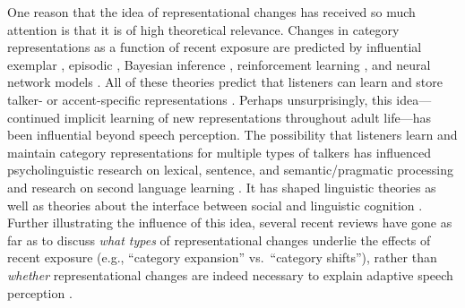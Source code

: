 \documentclass[
  11pt,
  man,floatsintext]{apa6}
\begin{document}
One reason that the idea of representational changes has received so much attention is that it is of high theoretical relevance. Changes in category representations as a function of recent exposure are predicted by influential exemplar \autocite{apfelbaum-mcmurray2015,johnson2006}, episodic \autocite{goldinger1998}, Bayesian inference \autocite{kleinschmidt-jaeger2015}, reinforcement learning \autocite{harmon2019}, and neural network models \autocite{lancia-winter2013}. All of these theories predict that listeners can learn and store talker- or accent-specific representations \autocites[see also][]{bradlow-bent2008,baeseberk2013,tzeng2016}. Perhaps unsurprisingly, this idea---continued implicit learning of new representations throughout adult life---has been influential beyond speech perception. The possibility that listeners learn and maintain category representations for multiple types of talkers has influenced psycholinguistic research on lexical, sentence, and semantic/pragmatic processing \autocites{chang2012,fine2013,kaschak2004,pogue2016,prasad2021,ryskin2019,schuster-degen2020}[ for review, see][]{brown-schmidt2015} and research on second language learning \autocites[for reviews, see][]{kaan-chun2018,pajak2016}. It has shaped linguistic theories \autocites[e.g.,][]{bybee2001,goldinger-azuma2004,hay2019,magnuson-nusbaum2007,pierrehumbert2001} as well as theories about the interface between social and linguistic cognition \autocites[e.g.,][]{babel2019,creel-bregman2011,foulkes-hay2015,hanulikova2012,sumner2014}. Further illustrating the influence of this idea, several recent reviews have gone as far as to discuss \emph{what types} of representational changes underlie the effects of recent exposure (e.g., ``category expansion'' vs.~``category shifts''), rather than \emph{whether} representational changes are indeed necessary to explain adaptive speech perception \autocites[e.g.,][]{baeseberk2020,bent-baeseberk2021,schertz-clare2020}.
\end{document}
